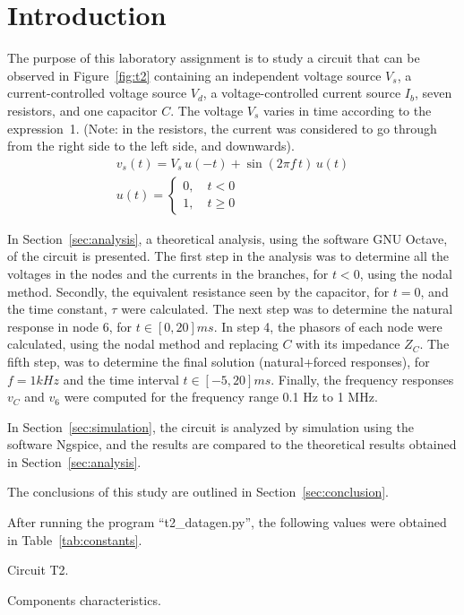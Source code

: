 \section{Introduction}
\label{sec:introduction}

The purpose of this laboratory assignment is to study a circuit that can be observed in Figure~\ref{fig:t2} containing an independent voltage source $V_s$, a current-controlled voltage source $V_d$, a voltage-controlled current source $I_b$,  seven resistors, and one capacitor $C$. The voltage $V_s$ varies in time according to the expression~1. (Note: in the resistors, the current was considered to go through from the right side to the left side, and downwards).
\begin{gather}\label{eq:vs} 
    v_s(t) = V_s\,u(-t) + \sin(2\pi f\,t)\,u(t) \\
    u(t) =
    \begin{cases}
    0,\quad t<0\\
    1,\quad t\geqslant 0
    \end{cases}
\end{gather}


In Section~\ref{sec:analysis}, a theoretical analysis, using the software GNU Octave, of the circuit is presented. The first step in the analysis was to determine all the voltages in the nodes and the currents in the branches, for $t<0$, using the nodal method. Secondly, the equivalent resistance seen by the capacitor, for $t=0$, and the time constant, $\tau$ were calculated. The next step was to determine the natural response in node 6, for $t\in [0,20]ms$. In step 4, the phasors of each node were calculated, using the nodal method and replacing $C$ with its impedance $Z_C$. The fifth step, was to determine the final solution (natural+forced responses), for $f=1kHz$ and the time interval $t\in [-5,20]ms$. Finally, the frequency responses $v_C$ and $v_6$ were computed for the frequency range 0.1 Hz to 1 MHz.

In Section~\ref{sec:simulation}, the circuit is analyzed by
simulation using the software Ngspice, and the results are compared to the theoretical results obtained in
Section~\ref{sec:analysis}. 

The conclusions of this study are outlined in
Section~\ref{sec:conclusion}.



After running the program ``t2\_datagen.py'', the following values were obtained in Table~\ref{tab:constants}.

\begin{minipage}[b]{0.48\textwidth}
\centering
    \captionsetup{type=figure}
\caption{Circuit T2.}
\label{fig:t2}
\end{minipage}
\begin{minipage}[b]{0.48\textwidth}
\centering
    \captionsetup{type=table}
  \caption{Components characteristics.}
  \label{tab:constants}
\end{minipage}
